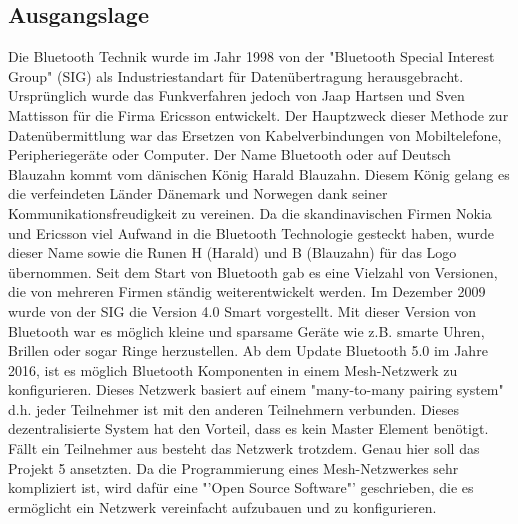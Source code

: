 
\subsection{Ausgangslage}\label{subsec:Ausgangslage}

Die Bluetooth Technik wurde im Jahr 1998 von der "Bluetooth Special Interest Group" (SIG) als Industriestandart für Datenübertragung herausgebracht. Ursprünglich wurde das Funkverfahren jedoch von Jaap Hartsen und Sven Mattisson für die Firma Ericsson entwickelt. Der Hauptzweck dieser Methode zur Datenübermittlung war das Ersetzen von Kabelverbindungen von Mobiltelefone, Peripheriegeräte oder Computer. Der Name Bluetooth oder auf Deutsch Blauzahn kommt vom dänischen König Harald Blauzahn. Diesem König gelang es die verfeindeten Länder Dänemark und Norwegen dank seiner Kommunikationsfreudigkeit zu vereinen. Da die skandinavischen Firmen Nokia und Ericsson viel Aufwand in die Bluetooth Technologie gesteckt haben, wurde dieser Name sowie die Runen H (Harald) und B (Blauzahn) für das Logo übernommen.\cite{michna_entwicklungsgeschichte_2019} Seit dem Start von Bluetooth gab es eine Vielzahl von Versionen, die von mehreren Firmen ständig weiterentwickelt werden. Im Dezember 2009 wurde von der SIG die Version 4.0 Smart vorgestellt. Mit dieser Version von Bluetooth war es möglich kleine und sparsame Geräte wie z.B. smarte Uhren, Brillen oder sogar Ringe herzustellen.\cite{bluetooth_sig_our_2019} Ab dem Update Bluetooth 5.0 im Jahre 2016, ist es möglich Bluetooth Komponenten in einem Mesh-Netzwerk zu konfigurieren. Dieses Netzwerk basiert auf einem "many-to-many pairing system" d.h. jeder Teilnehmer ist mit den anderen Teilnehmern verbunden. Dieses dezentralisierte System hat den Vorteil, dass es kein Master Element benötigt. Fällt ein Teilnehmer aus besteht das Netzwerk trotzdem.\cite{woolley_intro_2017} Genau hier soll das Projekt 5 ansetzten. Da die Programmierung eines Mesh-Netzwerkes sehr kompliziert ist, wird dafür eine "'Open Source Software"' geschrieben, die es ermöglicht ein Netzwerk vereinfacht aufzubauen und zu konfigurieren.








